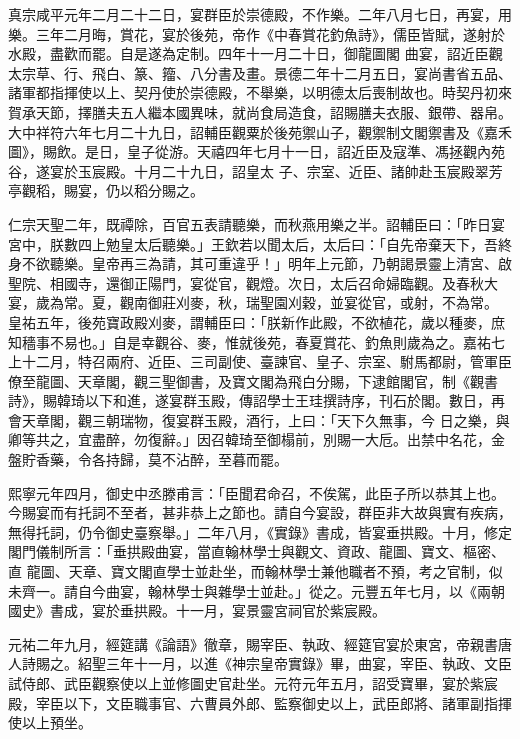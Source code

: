 \begin{pinyinscope}
 真宗咸平元年二月二十二日，宴群臣於崇德殿，不作樂。二年八月七日，再宴，用樂。三年二月晦，賞花，宴於後苑，帝作《中春賞花釣魚詩》，儒臣皆賦，遂射於水殿，盡歡而罷。自是遂為定制。四年十一月二十日，御龍圖閣
 曲宴，詔近臣觀太宗草、行、飛白、篆、籀、八分書及畫。景德二年十二月五日，宴尚書省五品、諸軍都指揮使以上、契丹使於崇德殿，不舉樂，以明德太后喪制故也。時契丹初來賀承天節，擇膳夫五人繼本國異味，就尚食局造食，詔賜膳夫衣服、銀帶、器帛。大中祥符六年七月二十九日，詔輔臣觀粟於後苑禦山子，觀禦制文閣禦書及《嘉禾圖》，賜飲。是日，皇子從游。天禧四年七月十一日，詔近臣及寇準、馮拯觀內苑谷，遂宴於玉宸殿。十月二十九日，詔皇太
 子、宗室、近臣、諸帥赴玉宸殿翠芳亭觀稻，賜宴，仍以稻分賜之。



 仁宗天聖二年，既禫除，百官五表請聽樂，而秋燕用樂之半。詔輔臣曰：「昨日宴宮中，朕數四上勉皇太后聽樂。」王欽若以聞太后，太后曰：「自先帝棄天下，吾終身不欲聽樂。皇帝再三為請，其可重違乎！」明年上元節，乃朝謁景靈上清宮、啟聖院、相國寺，還御正陽門，宴從官，觀燈。次日，太后召命婦臨觀。及春秋大宴，歲為常。夏，觀南御莊刈麥，秋，瑞聖園刈穀，並宴從官，或射，不為常。
 皇祐五年，後苑寶政殿刈麥，謂輔臣曰：「朕新作此殿，不欲植花，歲以種麥，庶知穡事不易也。」自是幸觀谷、麥，惟就後苑，春夏賞花、釣魚則歲為之。嘉祐七上十二月，特召兩府、近臣、三司副使、臺諫官、皇子、宗室、駙馬都尉，管軍臣僚至龍圖、天章閣，觀三聖御書，及寶文閣為飛白分賜，下逮館閣官，制《觀書詩》，賜韓琦以下和進，遂宴群玉殿，傳詔學士王珪撰詩序，刊石於閣。數日，再會天章閣，觀三朝瑞物，復宴群玉殿，酒行，上曰：「天下久無事，今
 日之樂，與卿等共之，宜盡醉，勿復辭。」因召韓琦至御榻前，別賜一大卮。出禁中名花，金盤貯香藥，令各持歸，莫不沾醉，至暮而罷。



 熙寧元年四月，御史中丞滕甫言：「臣聞君命召，不俟駕，此臣子所以恭其上也。今賜宴而有托詞不至者，甚非恭上之節也。請自今宴設，群臣非大故與實有疾病，無得托詞，仍令御史臺察舉。」二年八月，《實錄》書成，皆宴垂拱殿。十月，修定閣門儀制所言：「垂拱殿曲宴，當直翰林學士與觀文、資政、龍圖、寶文、樞密、直
 龍圖、天章、寶文閣直學士並赴坐，而翰林學士兼他職者不預，考之官制，似未齊一。請自今曲宴，翰林學士與雜學士並赴。」從之。元豐五年七月，以《兩朝國史》書成，宴於垂拱殿。十一月，宴景靈宮祠官於紫宸殿。



 元祐二年九月，經筵講《論語》徹章，賜宰臣、執政、經筵官宴於東宮，帝親書唐人詩賜之。紹聖三年十一月，以進《神宗皇帝實錄》畢，曲宴，宰臣、執政、文臣試侍郎、武臣觀察使以上並修圖史官赴坐。元符元年五月，詔受寶畢，宴於紫宸
 殿，宰臣以下，文臣職事官、六曹員外郎、監察御史以上，武臣郎將、諸軍副指揮使以上預坐。




\end{pinyinscope}
